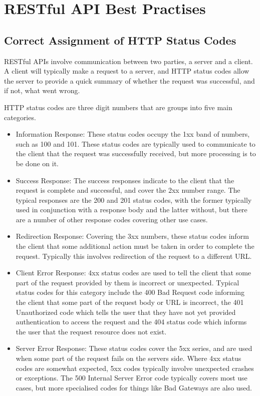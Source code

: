 \section{RESTful API Best Practises}
\subsection{Correct Assignment of HTTP Status Codes}
RESTful APIs involve communication between two parties, a server and a client. A client will typically make a request to a server, and HTTP status codes allow the server to provide a quick summary of whether the request was successful, and if not, what went wrong.

HTTP status codes are three digit numbers that are groups into five main categories.
\begin{itemize}
    \item Information Response: These status codes occupy the 1xx band of numbers, such as 100 and 101. These status codes are typically used to communicate to the client that the request was successfully received, but more processing is to be done on it.
    \item Success Response: The success responses indicate to the client that the request is complete and successful, and cover the 2xx number range. The typical responses are the 200 and 201 status codes, with the former typically used in conjunction with a response body and the latter without, but there are a number of other response codes covering other use cases.
    \item Redirection Response: Covering the 3xx numbers, these status codes inform the client that some additional action must be taken in order to complete the request. Typically this involves redirection of the request to a different URL.
    \item Client Error Response: 4xx status codes are used to tell the client that some part of the request provided by them is incorrect or unexpected. Typical status codes for this category include the 400 Bad Request code informing the client that some part of the request body or URL is incorrect, the 401 Unauthorized code which tells the user that they have not yet provided authentication to access the request and the 404 status code which informs the user that the request resource does not exist.
    \item Server Error Response: These status codes cover the 5xx series, and are used when some part of the request fails on the servers side. Where 4xx status codes are somewhat expected, 5xx codes typically involve unexpected crashes or exceptions. The 500 Internal Server Error code typically covers most use cases, but more specialised codes for things like Bad Gateways are also used. 
\end{itemize}

